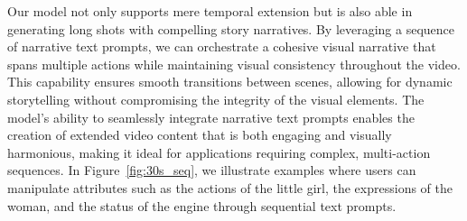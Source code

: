 \documentclass{article}
\begin{document}
{Our model not only supports mere temporal extension but is also able in generating long shots with compelling story narratives. By leveraging a sequence of narrative text prompts, we can orchestrate a cohesive visual narrative that spans multiple actions while maintaining visual consistency throughout the video. This capability ensures smooth transitions between scenes, allowing for dynamic storytelling without compromising the integrity of the visual elements. The model's ability to seamlessly integrate narrative text prompts enables the creation of extended video content that is both engaging and visually harmonious, making it ideal for applications requiring complex, multi-action sequences. In Figure~\ref{fig:30s_seq}, we illustrate examples where users can manipulate attributes such as the actions of the little girl, the expressions of the woman, and the status of the engine through sequential text prompts.





}
\end{document}
